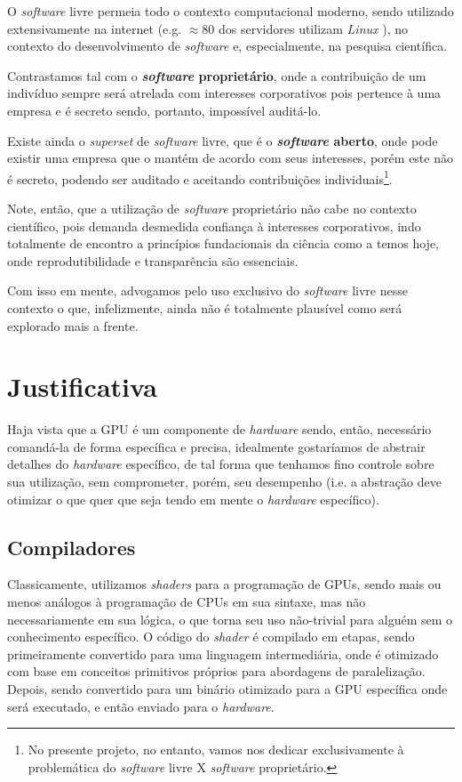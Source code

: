 \documentclass[10pt, a4paper, draftcls, conference, onecolumn]{IEEEtran}
\begin{document}
O \textit{software} livre permeia todo o contexto computacional moderno, sendo
utilizado extensivamente na internet (e.g. $\approx 80$ dos servidores utilizam
\textit{Linux} \cite{w3techs}), no contexto do desenvolvimento de \textit{software} e,
especialmente, na pesquisa científica.

Contrastamos tal com o \textbf{\textit{software} proprietário}, onde a
contribuição de um indivíduo sempre será atrelada com interesses corporativos
pois pertence à uma empresa e é secreto sendo, portanto, impossível auditá-lo.

Existe ainda o \textit{superset} de \textit{software} livre, que é o
\textbf{\textit{software} aberto}, onde pode existir uma empresa que o mantém
de acordo com seus interesses, porém este não é secreto, podendo ser auditado e
aceitando contribuições individuais\footnote{ No presente projeto, no entanto,
vamos nos dedicar exclusivamente à problemática do \textit{software} livre X
\textit{software} proprietário. }.

Note, então, que a utilização de \textit{software} proprietário não cabe no
contexto científico, pois demanda desmedida confiança à interesses
corporativos, indo totalmente de encontro a princípios fundacionais da ciência
como a temos hoje, onde reprodutibilidade e transparência são essenciais.

Com isso em mente, advogamos pelo uso exclusivo do \textit{software} livre
nesse contexto o que, infelizmente, ainda não é totalmente plausível como será
explorado mais a frente.

\section{Justificativa}

Haja vista que a GPU é um componente de \textit{hardware} sendo, então,
necessário comandá-la de forma específica e precisa, idealmente gostaríamos de
abstrair detalhes do \textit{hardware} específico, de tal forma que tenhamos
fino controle sobre sua utilização, sem comprometer, porém, seu desempenho
(i.e. a abstração deve otimizar o que quer que seja tendo em mente o
\textit{hardware} específico).

\subsection{Compiladores}

Classicamente, utilizamos \textit{shaders} para a programação de GPUs, sendo
mais ou menos análogos à programação de CPUs em sua sintaxe, mas não
necessariamente em sua lógica, o que torna seu uso não-trivial para alguém sem
o conhecimento específico. O código do \textit{shader} é compilado em
etapas, sendo primeiramente convertido para uma linguagem intermediária, onde é
otimizado com base em conceitos primitivos próprios para abordagens de
paralelização. Depois, sendo convertido para um binário otimizado para a GPU
específica onde será executado, e então enviado para o \textit{hardware}.
\end{document}
